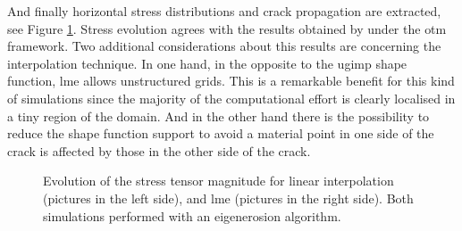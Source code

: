 \documentclass[preprint,12pt,a4paper]{elsarticle}
\begin{document}
And finally horizontal stress distributions and crack propagation are
extracted, see Figure \ref{fig:Stress-vs-damage-impact-test}. Stress
evolution agrees with the results obtained by \cite{Navas_2017_ES}
under the \acrshort{otm} framework. Two additional considerations about
this results are concerning the interpolation technique. In one hand,
in the opposite to the \acrshort{ugimp} shape function, \acrshort{lme}
allows unstructured grids. This is a remarkable benefit for this kind
of simulations since the majority of the computational effort is
clearly localised in a tiny region of the domain. And in the other
hand there is the possibility to reduce the shape function support to avoid
a material point in one side of the crack is affected by those in the
other side of the crack. 
\begin{figure}
\centering
{}
\caption{Evolution of the stress tensor magnitude for linear
  interpolation (pictures in the left side), and \acrshort{lme}
  (pictures in the right side). Both simulations performed with an
  eigenerosion algorithm.}
\label{fig:Stress-vs-damage-impact-test}
\end{figure}
\end{document}
